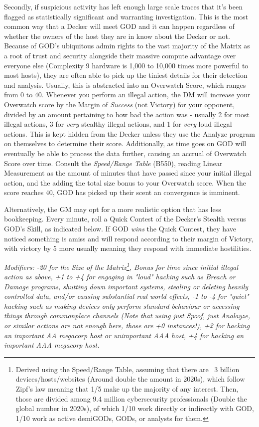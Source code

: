 \begin{multicols*}{3}
	Secondly, if suspicious activity has left enough large scale traces that it's been flagged as statistically significant and warranting investigation. This is the most common way that a Decker will meet GOD and it can happen regardless of whether the owners of the host they are in know about the Decker or not. Because of GOD's ubiquitous admin rights to the vast majority of the Matrix as a root of trust and security alongside their massive compute advantage over everyone else (Complexity 9 hardware is 1,000 to 10,000 times more powerful to most hosts), they are often able to pick up the tiniest details for their detection and analysis. Usually, this is abstracted into an Overwatch Score, which ranges from 0 to 40. Whenever you perform an illegal action, the DM will increase your Overwatch score by the Margin of \textit{Success} (not Victory) for your opponent, divided by an amount pertaining to how bad the action was - usually 2 for most illegal actions, 3 for \textit{very} stealthy illegal actions, and 1 for \textit{very} loud illegal actions. This is kept hidden from the Decker unless they use the Analyze program on themselves to determine their score. Additionally, as time goes on GOD will eventually be able to process the data further, causing an accrual of Overwatch Score over time. Consult the \textit{Speed/Range Table} (B550), reading Linear Measurement as the amount of minutes that have passed since your initial illegal action, and the adding the total size bonus to your Overwatch score. When the score reaches 40, GOD has picked up their scent an convergence is imminent.
	
	Alternatively, the GM may opt for a more realistic option that has less bookkeeping. Every minute, roll a Quick Contest of the Decker's Stealth versus GOD's Skill, as indicated below. If GOD \textit{wins} the Quick Contest, they have noticed something is amiss and will respond according to their margin of Victory, with victory by 5 more usually meaning they respond with immediate hostilities.
	
	\textcolor{NavyBlue}{\textit{Modifiers: -20 for the Size of the Matrix\footnote{Derived using the Speed/Range Table, assuming that there are ~3 billion devices/hosts/websites (Around double the amount in 2020s), which follow Zipf's law meaning that 1/5 make up the majority of any interest. Then, those are divided among 9.4 million cybersecurity professionals (Double the global number in 2020s), of which 1/10 work directly or indirectly with GOD, 1/10 work as active demiGODs, GODs, or analysts for them.}, Bonus for time since initial illegal action as above, +1 to +4 for engaging in "loud" hacking such as Breach or Damage programs, shutting down important systems, stealing or deleting heavily controlled data, and/or causing substantial real world effects, -1 to -4 for "quiet" hacking such as making devices only perform standard behaviour or accessing things through commonplace channels (Note that using just Spoof, just Analayze, or similar actions are not enough here, those are +0 instances!), +2 for hacking an important AA megacorp host or unimportant AAA host, +4 for hacking an important AAA megacorp host.}}
	

\end{multicols*}
